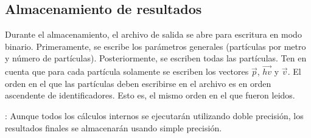 \subsection{Almacenamiento de resultados}

Durante el almacenamiento, el archivo de salida se abre para escritura
en modo binario. Primeramente, se escribe los parámetros generales (partículas
por metro y número de partículas). Posteriormente, se escriben todas las
partículas. Ten en cuenta que para cada partícula solamente se escriben los vectores
$\vec{p}$, $\overrightarrow{hv}$ y $\vec{v}$. El orden en el que las partículas
deben escribirse en el archivo es en orden ascendente de identificadores.
Esto es, el mismo orden en el que fueron leidos.

: 
Aunque todos los cálculos internos se ejecutarán utilizando doble precisión,
los resultados finales se almacenarán usando simple precisión.
